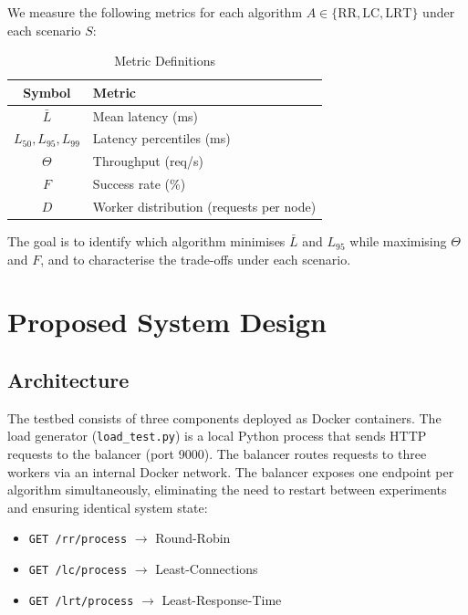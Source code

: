 \documentclass[conference]{IEEEtran}
\begin{document}
We measure the following metrics for each algorithm $A \in \{\text{RR}, \text{LC}, \text{LRT}\}$ under each scenario $S$:

\begin{table}[h]
  \centering
  \caption{Metric Definitions}
  \begin{tabular}{cl}
    \toprule
    \textbf{Symbol} & \textbf{Metric} \\
    \midrule
    $\bar{L}$               & Mean latency (ms) \\
    $L_{50}, L_{95}, L_{99}$ & Latency percentiles (ms) \\
    $\Theta$                & Throughput (req/s) \\
    $F$                     & Success rate (\%) \\
    $D$                     & Worker distribution (requests per node) \\
    \bottomrule
  \end{tabular}
\end{table}

The goal is to identify which algorithm minimises $\bar{L}$ and $L_{95}$ while maximising $\Theta$ and $F$, and to characterise the trade-offs under each scenario.

\section{Proposed System Design}

\subsection{Architecture}

The testbed consists of three components deployed as Docker containers. The load generator (\texttt{load\_test.py}) is a local Python process that sends HTTP requests to the balancer (port 9000). The balancer routes requests to three workers via an internal Docker network. The balancer exposes one endpoint per algorithm simultaneously, eliminating the need to restart between experiments and ensuring identical system state:

\begin{itemize}
  \item \texttt{GET /rr/process} $\rightarrow$ Round-Robin
  \item \texttt{GET /lc/process} $\rightarrow$ Least-Connections
  \item \texttt{GET /lrt/process} $\rightarrow$ Least-Response-Time
\end{itemize}
\end{document}
